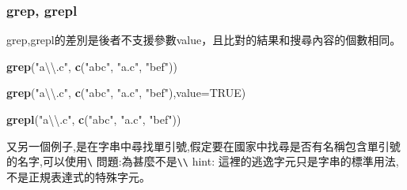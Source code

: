 \documentclass[]{book}
\newenvironment{Shaded}{\begin{snugshade}}{\end{snugshade}}
\newcommand{\KeywordTok}[1]{\textcolor[rgb]{0.13,0.29,0.53}{\textbf{#1}}}
\newcommand{\DataTypeTok}[1]{\textcolor[rgb]{0.13,0.29,0.53}{#1}}
\newcommand{\CharTok}[1]{\textcolor[rgb]{0.31,0.60,0.02}{#1}}
\newcommand{\StringTok}[1]{\textcolor[rgb]{0.31,0.60,0.02}{#1}}
\newcommand{\OtherTok}[1]{\textcolor[rgb]{0.56,0.35,0.01}{#1}}
\newcommand{\OperatorTok}[1]{\textcolor[rgb]{0.81,0.36,0.00}{\textbf{#1}}}
\newcommand{\NormalTok}[1]{#1}
\theoremstyle{definition}
\theoremstyle{definition}
\theoremstyle{definition}
\theoremstyle{remark}
\begin{document}
\subsubsection{grep, grepl}\label{grep-grepl}

grep,grepl的差別是後者不支援參數value，且比對的結果和搜尋內容的個數相同。

\begin{Shaded}
\begin{Highlighting}[]
\KeywordTok{grep}\NormalTok{(}\StringTok{"a}\CharTok{\textbackslash{}\textbackslash{}}\StringTok{.c"}\NormalTok{, }\KeywordTok{c}\NormalTok{(}\StringTok{"abc"}\NormalTok{, }\StringTok{"a.c"}\NormalTok{, }\StringTok{"bef"}\NormalTok{))}
\end{Highlighting}
\end{Shaded}

\begin{Shaded}
\begin{Highlighting}[]
\KeywordTok{grep}\NormalTok{(}\StringTok{"a}\CharTok{\textbackslash{}\textbackslash{}}\StringTok{.c"}\NormalTok{, }\KeywordTok{c}\NormalTok{(}\StringTok{"abc"}\NormalTok{, }\StringTok{"a.c"}\NormalTok{, }\StringTok{"bef"}\NormalTok{),}\DataTypeTok{value=}\OtherTok{TRUE}\NormalTok{)}
\end{Highlighting}
\end{Shaded}

\begin{Shaded}
\begin{Highlighting}[]
\KeywordTok{grepl}\NormalTok{(}\StringTok{"a}\CharTok{\textbackslash{}\textbackslash{}}\StringTok{.c"}\NormalTok{, }\KeywordTok{c}\NormalTok{(}\StringTok{"abc"}\NormalTok{, }\StringTok{"a.c"}\NormalTok{, }\StringTok{"bef"}\NormalTok{))}
\end{Highlighting}
\end{Shaded}

又另一個例子,是在字串中尋找單引號,假定要在國家中找尋是否有名稱包含單引號的名字,可以使用\texttt{\textquotesingle{}\textbackslash{}\textquotesingle{}\textquotesingle{}}
問題:為甚麼不是\texttt{\textquotesingle{}\textbackslash{}\textbackslash{}\textquotesingle{}\textquotesingle{}}
hint:
這裡的逃逸字元只是字串的標準用法,\texttt{\textquotesingle{}}不是正規表達式的特殊字元。

\begin{Shaded}
\end{Shaded}
\end{document}
